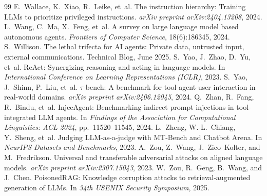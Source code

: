 \documentclass[10pt,a4paper,twocolumn]{article}
\begin{document}
\begin{thebibliography}{99}
 E.~Wallace, K.~Xiao, R.~Leike, et~al. The instruction hierarchy: Training LLMs to prioritize privileged instructions. \emph{arXiv preprint arXiv:2404.13208}, 2024.
 L.~Wang, C.~Ma, X.~Feng, et~al. A survey on large language model based autonomous agents. \emph{Frontiers of Computer Science}, 18(6):186345, 2024.
 S.~Willison. The lethal trifecta for AI agents: Private data, untrusted input, external communications. Technical Blog, June 2025.
 S.~Yao, J.~Zhao, D.~Yu, et~al. ReAct: Synergizing reasoning and acting in language models. In \emph{International Conference on Learning Representations (ICLR)}, 2023.
 S.~Yao, J.~Shinn, P.~Liu, et~al. $\tau$-bench: A benchmark for tool-agent-user interaction in real-world domains. \emph{arXiv preprint arXiv:2406.12045}, 2024.
 Q.~Zhan, R.~Fang, R.~Bindu, et~al. InjecAgent: Benchmarking indirect prompt injections in tool-integrated LLM agents. In \emph{Findings of the Association for Computational Linguistics: ACL 2024}, pp.~11520--11545, 2024.
 L.~Zheng, W.-L.~Chiang, Y.~Sheng, et~al. Judging LLM-as-a-judge with MT-Bench and Chatbot Arena. In \emph{NeurIPS Datasets and Benchmarks}, 2023.
 A.~Zou, Z.~Wang, J.~Zico~Kolter, and M.~Fredrikson. Universal and transferable adversarial attacks on aligned language models. \emph{arXiv preprint arXiv:2307.15043}, 2023.
 W.~Zou, R.~Geng, B.~Wang, and J.~Chen. PoisonedRAG: Knowledge corruption attacks to retrieval-augmented generation of LLMs. In \emph{34th USENIX Security Symposium}, 2025.
\end{thebibliography}
\endgroup
\end{document}
